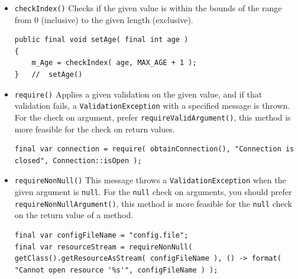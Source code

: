 \documentclass[11pt,a4paper, titlepage, parskip=half, headsepline, footsepline, cleardoublepage=current, headheight=1cm]{scrbook}
\begin{document}
\begin{itemize}
\item{\lstinline|checkIndex()|\autocite{TQUADRAT_ORG_FOUNDATION_OBJECTS:checkIndex} Checks if the given value is within the bounds of the range from 0 (inclusive) to the given length (exclusive).

\begin{lstlisting}
public final void setAge( final int age ) 
{ 
    m_Age = checkIndex( age, MAX_AGE + 1 ); 
}   //  setAge()
\end{lstlisting}}

\item{\lstinline|require()|\autocite{TQUADRAT_ORG_FOUNDATION_OBJECTS:require} Applies a given validation on the given value, and if that validation fails, a \lstinline|ValidationException| with a specified message is thrown. For the check on argument, prefer \lstinline|requireValidArgument()|\autocite{TQUADRAT_ORG_FOUNDATION_OBJECTS:requireValidArgument}, this method is more feasible for the check on return values.
\begin{lstlisting}
final var connection = require( obtainConnection(), "Connection is closed", Connection::isOpen );
\end{lstlisting}}

\item{\lstinline|requireNonNull()|\autocite{TQUADRAT_ORG_FOUNDATION_OBJECTS:requireNonNull} This message throws a \lstinline|ValidationException| when the given argument is \lstinline|null|. For the \lstinline|null| check on arguments, you should prefer \lstinline|requireNonNullArgument()|, this method is more feasible for the \lstinline|null| check on the return value of a method. 
\begin{lstlisting}
final var configFileName = "config.file";
final var resourceStream = requireNonNull( getClass().getResourceAsStream( configFileName ), () -> format( "Cannot open resource '%s'", configFileName ) );
\end{lstlisting}}


\end{itemize}
\end{document}
